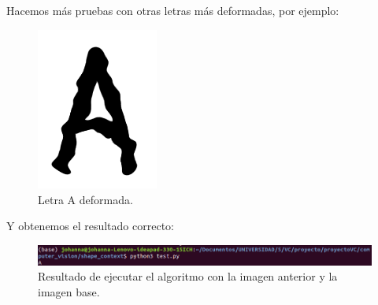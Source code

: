 \documentclass[size=a4, parskip=half, titlepage=false, toc=flat, toc=bib, 12pt]{scrartcl}
\begin{document}
Hacemos más pruebas con otras letras más deformadas, por ejemplo:

\begin{figure}[H]
\centering
\includegraphics[width=4cm]{./img/AM}
\caption{Letra A deformada.}
\end{figure}

Y obtenemos el resultado correcto:
\begin{figure}[H]
\centering
\includegraphics[width=15cm]{./img/resa}
\caption{Resultado de ejecutar el algoritmo con la imagen anterior y la imagen base.}
\end{figure}

\end{document}
